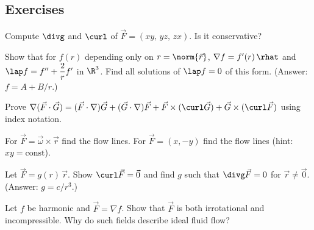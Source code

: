 \subsection*{Exercises}
\begin{exercise}
Compute $\divg$ and $\curl$ of $\vec F=(xy,\,yz,\,zx)$. Is it conservative?
\end{exercise}
\begin{exercise}
Show that for $f(r)$ depending only on $r=\norm{\vec r}$, $\nabla f=f'(r)\,\rhat$ and $\lap f=f''+\dfrac2rf'$ in $\R^3$. Find all solutions of $\lap f=0$ of this form. (Answer: $f=A+B/r$.)
\end{exercise}
\begin{exercise}
Prove $\nabla(\vec F\cdot\vec G)=(\vec F\cdot\nabla)\vec G+(\vec G\cdot\nabla)\vec F+\vec F\times(\curl\vec G)+\vec G\times(\curl\vec F)$ using index notation.
\end{exercise}
\begin{exercise}
For $\vec F=\vec\omega\times\vec r$ find the flow lines. For $\vec F=(x,-y)$ find the flow lines (hint: $xy=\text{const}$).
\end{exercise}
\begin{exercise}
Let $\vec F=g(r)\,\vec r$. Show $\curl\vec F=\vec 0$ and find $g$ such that $\divg\vec F=0$ for $\vec r\ne\vec0$. (Answer: $g=c/r^3$.)
\end{exercise}
\begin{exercise}
Let $f$ be harmonic and $\vec F=\nabla f$. Show that $\vec F$ is both irrotational and incompressible. Why do such fields describe ideal fluid flow?
\end{exercise}
